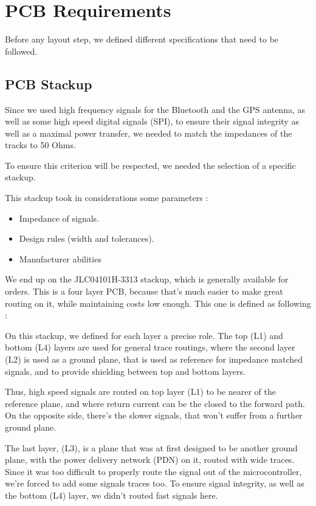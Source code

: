 \section{PCB Requirements}
Before any layout step, we defined different specifications that need to be followed.

\subsection{PCB Stackup}
Since we used high frequency signals for the Bluetooth and the GPS antenna, as well as
some high speed digital signals (SPI), to ensure their signal integrity as well as a
maximal power transfer, we needed to match the impedances of the tracks to 50 Ohms.

To ensure this criterion will be respected, we needed the selection of a specific stackup.

This stackup took in considerations some parameters :
\begin{itemize}
    \item   Impedance of signals.
    \item   Design rules (width and tolerances).
    \item   Manufacturer abilities
\end{itemize}

We end up on the JLC04101H-3313 stackup, which is generally available for orders. This is a four
layer PCB, because that's much easier to make great routing on it, while maintaining costs low
enough. This one is defined as following :



On this stackup, we defined for each layer a precise role.
The top (L1) and bottom (L4) layers are used for general trace routings, where the second
layer (L2) is used as a ground plane, that is used as reference for impedance matched
signals, and to provide shielding between top and bottom layers.

Thus, high speed signals are routed on top layer (L1) to be nearer of the reference plane, and
where return current can be the closed to the forward path.
On the opposite side, there's the slower signals, that won't suffer from a further ground plane.

The last layer, (L3), is a plane that was at first designed to be another ground plane, with the
power delivery network (PDN) on it, routed with wide traces. Since it was too difficult to
properly route the signal out of the microcontroller, we're forced to add some signals traces too.
To ensure signal integrity, as well as the bottom (L4) layer, we didn't routed fast signals here.

